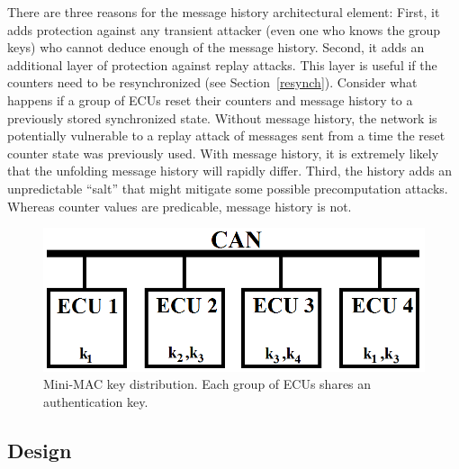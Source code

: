 There are three reasons for the message history architectural element:  
First, it adds protection against any transient
attacker (even one who knows the group keys) who cannot deduce enough of the 
message history.  
Second, it adds an additional layer of protection against replay attacks.
This layer is useful if the counters need to be resynchronized (see Section~\ref{resynch}).
Consider what happens if a group of ECUs reset their counters and message history to
a previously stored synchronized state.  Without message history, the network
is potentially vulnerable to a replay attack of messages sent from a time 
the reset counter state was previously used.  With message history, it is extremely
likely that the unfolding message history will rapidly differ.
Third, the history adds an unpredictable ``salt'' that might mitigate some possible
precomputation attacks.  Whereas counter values are predicable, message history
is not.

	\begin{figure}
		\centering
		\includegraphics[width=\columnwidth]{figures/key_distribution.png}
		\caption{Mini-MAC key distribution.  Each group of ECUs shares an authentication key.}
		\label{fig-key}
	\end{figure}
	
\subsection{Design}
\label{design}

